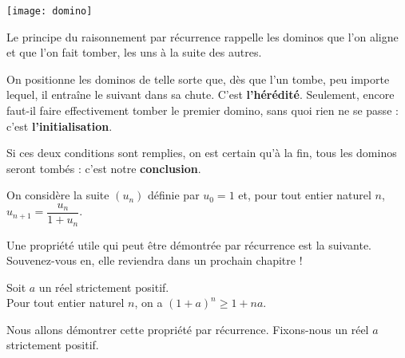 \documentclass[11pt,fleqn]{book} %
\begin{document}
\begin{minipage}{0.15\linewidth}
\begin{center}
\texttt{[image: domino]}
\end{center}
\end{minipage}\hfill\begin{minipage}{0.78\linewidth}
Le principe du raisonnement par récurrence rappelle les dominos que l'on aligne et que l'on fait tomber, les uns à la suite des autres.

\vskip5pt
On positionne les dominos de telle sorte que, dès que l'un tombe, peu importe lequel, il entraîne le suivant dans sa chute. C'est \textbf{l'hérédité}. Seulement, encore faut-il faire effectivement tomber le premier domino, sans quoi rien ne se passe : c'est \textbf{l'initialisation}.

\vskip5pt
Si ces deux conditions sont remplies, on est certain qu'à la fin, tous les dominos seront tombés : c'est notre \textbf{conclusion}.\end{minipage}

\newpage
\begin{example}
On considère la suite \((u_n)\) définie par \(u_0=1\) et, pour tout entier naturel \(n\), $u_{n+1}=\dfrac{u_n}{1+u_n}$.
\vskip300pt
\end{example}


Une propriété utile qui peut être démontrée par récurrence est la suivante. Souvenez-vous en, elle reviendra dans un prochain chapitre !

\begin{proposition} Soit $a$ un réel strictement positif. \\ Pour tout entier naturel $n$, on a $(1+a)^n \geqslant 1+na$.\end{proposition}

\begin{demonstration}Nous allons démontrer cette propriété par récurrence. Fixons-nous un réel $a$ strictement positif. 
\vskip200pt
\end{demonstration}
\end{document}
